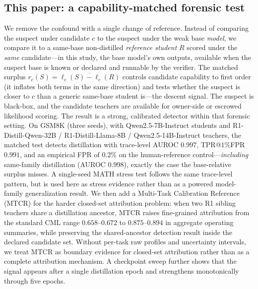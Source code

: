 \subsection{This paper: a capability-matched forensic test}
We remove the confound with a single change of reference. Instead of comparing the
suspect under candidate $c$ to the suspect under the weak base \emph{model}, we
compare it to a same-base non-distilled \emph{reference student} $R$ scored under the
\emph{same} candidate---in this study, the base model's own outputs, available when
the suspect base is known or declared and runnable by the verifier. The matched
surplus $r_c(S)=\overline{\ell_c(S)-\ell_c(R)}$ controls candidate capability to
first order (it inflates both terms in the same direction) and tests whether the
suspect is closer to $c$ than a generic same-base student is---the descent signal.
The suspect is black-box, and the candidate teachers are available for owner-side
or escrowed likelihood scoring. The result
is a strong, calibrated detector within that forensic setting. On GSM8K (three
seeds), with Qwen2.5-7B-Instruct students and R1-Distill-Qwen-32B /
R1-Distill-Llama-8B / Qwen2.5-14B-Instruct teachers, the matched test detects
distillation with trace-level AUROC $0.997$, TPR@$1\%$FPR $0.991$, and an empirical
FPR of $0.2\%$ on the human-reference control---\emph{including} same-family
distillation (AUROC $0.998$), exactly the case the base-relative surplus misses. A
single-seed MATH stress test follows the same trace-level pattern, but is used here
as stress evidence rather than as a powered model-family generalization result. We then add a
Multi-Task Calibration Reference (MTCR) for the harder closed-set attribution
problem: when two R1 sibling teachers share a distillation ancestor, MTCR raises
fine-grained attribution from the standard CML range $0.658$--$0.672$ to
$0.875$--$0.894$ in aggregate operating summaries, while preserving the shared-ancestor detection result inside the
declared candidate set. Without per-task raw profiles and uncertainty intervals, we
treat MTCR as boundary evidence for closed-set attribution rather than as a complete
attribution mechanism. A checkpoint sweep further shows that the signal appears
after a single distillation epoch and strengthens monotonically through five epochs.

